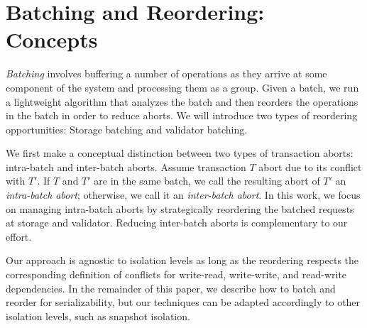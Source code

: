 \section{Batching and Reordering: Concepts}\label{sec:overview}


\emph{Batching} involves buffering a number of operations as they arrive at some component of the system and processing them as a group. 
Given a batch, we run a lightweight algorithm that analyzes the batch and then reorders the operations in the batch in order to reduce aborts. We will introduce two types of reordering opportunities: Storage batching and validator batching.

We first make a conceptual distinction between two types of transaction aborts: intra-batch and inter-batch aborts. Assume transaction $T$ abort due to its conflict with $T'$. If $T$ and $T'$ are in the same batch, we call the resulting abort of $T'$ an \emph{intra-batch abort}; otherwise, we call it an \emph{inter-batch abort}.
In this work, we focus on managing intra-batch aborts by strategically reordering the batched requests at storage and validator. 
Reducing inter-batch aborts is complementary to our effort. 

Our approach is agnostic to isolation levels as long as the reordering respects the corresponding definition of conflicts for 
write-read, write-write, and read-write dependencies. In the remainder of this paper, we describe 
how to batch and reorder for serializability, but our techniques can be adapted accordingly to other isolation levels, 
such as snapshot isolation.


